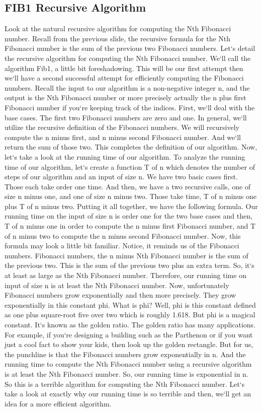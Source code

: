 \subsection{FIB1  Recursive Algorithm}
Look at the natural recursive algorithm for computing the Nth Fibonacci number.
Recall from the previous slide, the recursive formula for the Nth Fibonacci number is the sum of the previous two Fibonacci numbers.
Let`s detail the recursive algorithm for computing the Nth Fibonacci number.
We`ll call the algorithm Fib1, a little bit foreshadowing.
This will be our first attempt then we`ll have a second successful attempt for efficiently computing the Fibonacci numbers.
Recall the input to our algorithm is a non-negative integer n, and the output is the Nth Fibonacci number or more precisely actually the n plus first Fibonacci number if you`re keeping track of the indices.
First, we`ll deal with the base cases.
The first two Fibonacci numbers are zero and one.
In general, we`ll utilize the recursive definition of the Fibonacci numbers.
We will recursively compute the n minus first, and n minus second Fibonacci number.
And we`ll return the sum of those two.
This completes the definition of our algorithm.
Now, let`s take a look at the running time of our algorithm.
To analyze the running time of our algorithm, let`s create a function T of n which denotes the number of steps of our algorithm and an input of size n.
We have two basic cases first.
Those each take order one time.
And then, we have a two recursive calls, one of size n minus one, and one of size n minus two.
Those take time, T of n minus one plus T of n minus two.
Putting it all together, we have the following formula.
Our running time on the input of size n is order one for the two base cases and then, T of n minus one in order to compute the n minus first Fibonacci number, and T of n minus two to compute the n minus second Fibonacci number.
Now, this formula may look a little bit familiar.
Notice, it reminds us of the Fibonacci numbers.
Fibonacci numbers, the n minus Nth Fibonacci number is the sum of the previous two.
This is the sum of the previous two plus an extra term.
So, it`s at least as large as the Nth Fibonacci number.
Therefore, our running time on input of size n is at least the Nth Fibonacci number.
Now, unfortunately Fibonacci numbers grow exponentially and then more precisely.
They grow exponentially in this constant phi.
What is phi? Well, phi is this constant defined as one plus square-root five over two which is roughly 1.618.
But phi is a magical constant.
It`s known as the golden ratio.
The golden ratio has many applications.
For example, if you`re designing a building such as the Parthenon or if you want just a cool fact to show your kids, then look up the golden rectangle.
But for us, the punchline is that the Fibonacci numbers grow exponentially in n.
And the running time to compute the Nth Fibonacci number using a recursive algorithm is at least the Nth Fibonacci number.
So, our running time is exponential in n.
So this is a terrible algorithm for computing the Nth Fibonacci number.
Let`s take a look at exactly why our running time is so terrible and then, we`ll get an idea for a more efficient algorithm.

